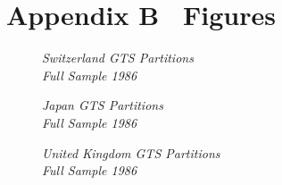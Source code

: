 \section*{Appendix B \textendash \ Figures}

\vspace{10em}
\begin{figure}[h]
  \centering
  \caption[Switzerland GTS Partitions]{\textit{Switzerland GTS Partitions\\
    Full Sample 1986 }}
  \label{fig:CH}  
\end{figure}

\begin{figure}[h]
  \centering
  \caption[Japan GTS Partitions]{\textit{Japan GTS Partitions\\
    Full Sample 1986 }}
  \label{fig:JP}  
\end{figure}

\begin{figure}[h]
  \centering
  \caption[United Kingdom GTS Partitions]{\textit{United Kingdom GTS Partitions\\
    Full Sample 1986 }}
  \label{fig:UK}
\end{figure}
